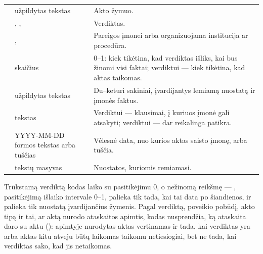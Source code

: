 \par\nopagebreak
\begin{xltabular}{\textwidth}{@{}L{38mm}L{34mm}Y@{}}
\toprule
{} &  &  \\
\midrule
\endhead
\bottomrule
\endlastfoot
{} & užpildytas tekstas & Akto žymuo. \\
 & , ,  & Verdiktas. \\
 & ,  & Pareigos įmonei arba organizuojama institucija ar procedūra. \\
 & skaičius & 0--1: kiek tikėtina, kad verdiktas išliks, kai bus žinomi visi faktai; verdiktui  --- kiek tikėtina, kad aktas taikomas. \\
 & užpildytas tekstas & Du--keturi sakiniai, įvardijantys lemiamą nuostatą ir įmonės faktus. \\
 & tekstas & Verdiktui  --- klausimai, į kuriuos įmonė gali atsakyti; verdiktui  --- dar reikalinga patikra. \\
 & YYYY-MM-DD formos tekstas arba tuščias & Vėlesnė data, nuo kurios aktas saisto įmonę, arba tuščia. \\
 & tekstų masyvas & Nuostatos, kuriomis remiamasi. \\
\end{xltabular}

Trūkstamą verdiktą kodas laiko  su pasitikėjimu 0, o nežinomą reikšmę ---
, pasitikėjimą išlaiko intervale 0--1,  palieka tik tada, kai
tai data po šiandienos, ir palieka tik nuostatą įvardijančius žymenis. Pagal verdiktą, poveikio
pobūdį, akto tipą ir tai, ar aktą nurodo ataskaitos apimtis, kodas nusprendžia, ką ataskaita
daro su aktu (): apimtyje nurodytas aktas vertinamas ir tada, kai verdiktas
yra  arba aktas kitu atveju būtų laikomas taikomu netiesiogiai, bet ne tada, kai
verdiktas sako, kad jis netaikomas.

